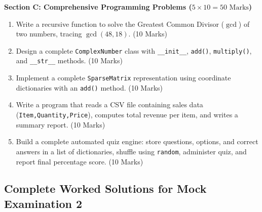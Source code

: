 \begin{mockexam}
\medskip
\noindent\textbf{Section C: Comprehensive Programming Problems ($5 \times 10 = 50\text{ Marks}$)}
\begin{enumerate}[leftmargin=1.5em, start=17]
    \item Write a recursive function to solve the Greatest Common Divisor ($\gcd$) of two numbers, tracing $\gcd(48, 18)$. (10 Marks)
    \item Design a complete \texttt{ComplexNumber} class with \texttt{\_\_init\_\_}, \texttt{add()}, \texttt{multiply()}, and \texttt{\_\_str\_\_} methods. (10 Marks)
    \item Implement a complete \texttt{SparseMatrix} representation using coordinate dictionaries with an \texttt{add()} method. (10 Marks)
    \item Write a program that reads a CSV file containing sales data (\texttt{Item,Quantity,Price}), computes total revenue per item, and writes a summary report. (10 Marks)
    \item Build a complete automated quiz engine: store questions, options, and correct answers in a list of dictionaries, shuffle using \texttt{random}, administer quiz, and report final percentage score. (10 Marks)
\end{enumerate}
\end{mockexam}

\subsection{Complete Worked Solutions for Mock Examination 2}

